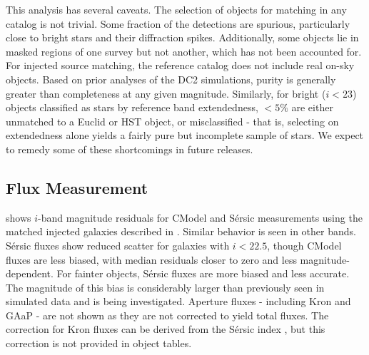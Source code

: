 This analysis has several caveats.
The selection of objects for matching in any catalog is not trivial.
Some fraction of the detections are spurious, particularly close to bright stars and their diffraction spikes.
Additionally, some objects lie in masked regions of one survey but not another, which has not been accounted for. 
For injected source matching, the reference catalog does not include real on-sky objects.
Based on prior analyses of the \gls{DC2} simulations, purity is generally greater than completeness at any given magnitude.
Similarly, for bright ($i<23$) objects classified as stars by reference band extendedness, $<5\%$ are either unmatched to a Euclid or HST object, or misclassified - that is, selecting on extendedness alone yields a fairly pure but incomplete sample of stars.
We expect to remedy some of these shortcomings in future releases.

\subsection{Flux Measurement}
\label{ssec:fluxes}

 shows $i$-band magnitude residuals for CModel and S\'ersic measurements using the matched injected galaxies described in .
Similar behavior is seen in other bands.
S\'ersic fluxes show reduced scatter for galaxies with $i<22.5$, though CModel fluxes are less biased, with median residuals closer to zero and less magnitude-dependent.
For fainter objects, S\'ersic fluxes are more biased and less accurate.
The magnitude of this bias is considerably larger than previously seen in simulated data and is being investigated.
Aperture fluxes - including Kron and \gls{GAaP} - are not shown as they are not corrected to yield total fluxes.
The correction for Kron fluxes can be derived from the S\'ersic index \citep{2005PASA...22..118G}, but this correction is not provided in object tables.

